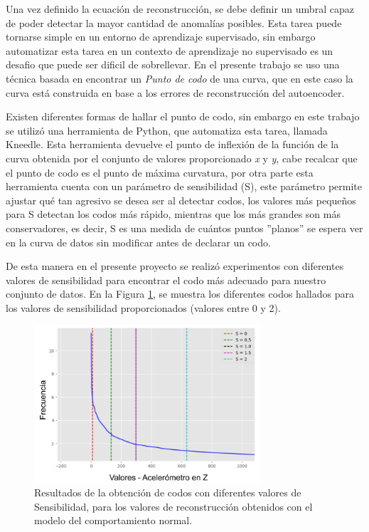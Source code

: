 Una vez definido la ecuaci\'{o}n de reconstrucci\'{o}n, se debe definir un umbral capaz de poder detectar la mayor cantidad de anomal\'{i}as posibles. Esta tarea puede tornarse simple en un entorno de aprendizaje supervisado, sin embargo automatizar esta tarea en un contexto de aprendizaje no supervisado es un desafio que puede ser dificil de sobrellevar. En el presente trabajo se uso una t\'{e}cnica basada en encontrar un \textit{Punto de codo} de una curva, que en este caso la curva est\'{a} construida en base a los errores de reconstrucci\'{o}n del autoencoder.

\vspace{5mm} %

Existen diferentes formas de hallar el punto de codo, sin embargo en este trabajo se utiliz\'{o} una herramienta de Python, que automatiza esta tarea, llamada Kneedle. Esta herramienta devuelve el punto de inflexi\'{o}n de la funci\'{o}n de la curva obtenida por el conjunto de valores proporcionado \textit{x} y \textit{y}, cabe recalcar que el punto de codo es el punto de m\'{a}xima curvatura, por otra parte esta herramienta cuenta con un par\'{a}metro de sensibilidad (S), este par\'{a}metro permite ajustar qu\'{e} tan agresivo se desea ser al detectar codos, los valores m\'{a}s peque\~{n}os para S detectan los codos m\'{a}s r\'{a}pido, mientras que los m\'{a}s grandes son m\'{a}s conservadores, es decir, S es una medida de cu\'{a}ntos puntos ''planos'' se espera ver en la curva de datos sin modificar antes de declarar un codo.

\vspace{5mm} %

De esta manera en el presente proyecto se realiz\'{o} experimentos con diferentes valores de sensibilidad para encontrar el codo m\'{a}s adecuado para nuestro conjunto de datos. En la Figura \ref{fig:zoom_codos}, se muestra los diferentes codos hallados para los valores de sensibilidad proporcionados (valores entre 0 y 2).

\begin{figure}[H]
        \centering
            \includegraphics[width=0.75\textwidth, frame]{imagenes/Cap5/zoom_codos}
        \caption{Resultados de la obtenci\'{o}n de codos con diferentes valores de Sensibilidad, para los valores de reconstrucci\'{o}n obtenidos con el modelo del comportamiento normal.}
		\label{fig:zoom_codos}
\end{figure}

